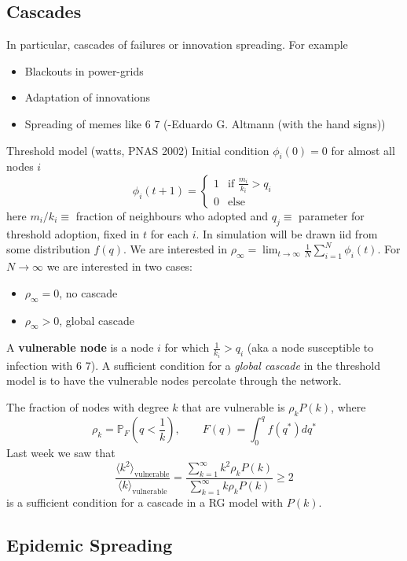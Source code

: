 \documentclass[12pt]{article}
\theoremstyle{definition}
\begin{document}
\subsection{Cascades}
In particular, cascades of failures or innovation spreading. For example
\begin{itemize}
    \item Blackouts in power-grids 
    \item Adaptation of innovations 
    \item Spreading of memes like 6 7 (-Eduardo G. Altmann (with the hand signs)) 
\end{itemize}
Threshold model (watts, PNAS 2002)
Initial condition $\phi_i(0) =0$ for almost all nodes $i$
\[
    \phi_i(t+1) =\begin{cases}
        1 & \text{if } \frac{m_i}{k_i}>q_i\\
        0 & \text{else}
    \end{cases}
\]
here $m_i/k_i \equiv$ fraction of neighbours who adopted and $q_j \equiv$ parameter for threshold adoption, fixed in $t$ for each $i$. In simulation will be drawn iid from some distribution $f(q)$. We are interested in $\rho_\infty = \lim_{t\to\infty} \frac 1 N \sum_{i=1}^N\phi_i(t)$. For $N\to\infty$ we are interested in two cases: 
\begin{itemize}
    \item $\rho_\infty=0$, no cascade
    \item $\rho_\infty>0$, global cascade
\end{itemize}

A \textbf{vulnerable node} is a node $i$ for which $\frac{1}{k_i}>q_i$ (aka a node susceptible to infection with 6 7). A sufficient condition for a \textit{global cascade} in the threshold model is to have the vulnerable nodes percolate through the network. 

The fraction of nodes with degree $k$ that are vulnerable is $\rho_kP(k)$, where
\[
\rho_k=\mathbb{P}_F\left(q< \frac 1 k\right), \qquad F(q)=\int_0^qf(q^*)dq^*
\]
Last week we saw that
\[
\frac{\langle k^2\rangle_{\text{vulnerable}}}{\langle k\rangle_{\text{vulnerable}}} = \frac{\sum_{k=1}^\infty k^2\rho_kP(k)}{\sum_{k=1}^\infty k\rho_kP(k)}\geq 2
\]
is a sufficient condition for a cascade in a RG model with $P(k)$. 

\subsection{Epidemic Spreading}
\end{document}
